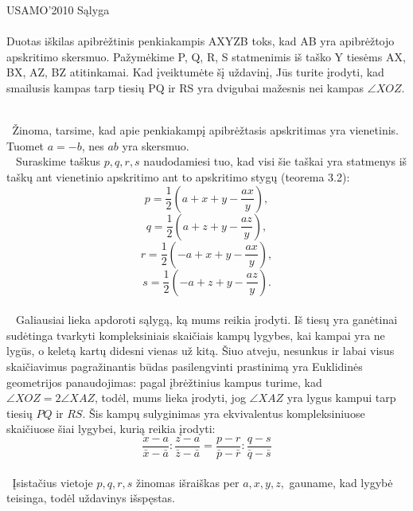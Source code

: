 \begin{pavnr}
USAMO'2010 Sąlyga
\\
   \\Duotas iškilas apibrėžtinis penkiakampis AXYZB toks, kad AB yra apibrėžtojo apskritimo
   skersmuo. Pažymėkime P, Q, R, S statmenimis iš taško Y tiesėms  AX, BX, AZ, BZ atitinkamai.
   Kad įveiktumėte šį uždavinį, Jūs turite įrodyti, kad smailusis kampas tarp tiesių PQ ir RS
   yra dvigubai mažesnis nei kampas $ \angle XOZ$.
\end{pavnr}
\begin{sprendimas}
  \\ $\phantom{a}$Žinoma, tarsime, kad apie penkiakampį apibrėžtasis apskritimas yra vienetinis.
      Tuomet $a = -b$, nes $ab$ yra skersmuo.
  \\ $\phantom{a}$
Suraskime taškus $p, q, r, s$ naudodamiesi tuo, kad visi šie taškai yra statmenys iš taškų ant vienetinio apskritimo
ant to apskritimo stygų (teorema 3.2):
     $$p = \frac {1}{2}( a+x+y- \frac {ax}{y}),$$
     $$q = \frac {1}{2}( a+z+y- \frac {az}{y}),$$ 
     $$r = \frac {1}{2}( -a+x+y- \frac {ax}{y}),$$
     $$s = \frac {1}{2}( -a+z+y- \frac {az}{y}).$$
  \\ $\phantom{a}$ Galiausiai lieka apdoroti sąlygą, ką mums reikia įrodyti. Iš tiesų yra
      ganėtinai sudėtinga tvarkyti kompleksiniais skaičiais kampų lygybes, 
      kai kampai yra ne lygūs, o keletą kartų didesni vienas už kitą.
      Šiuo atveju, nesunkus ir labai visus skaičiavimus pagražinantis būdas
      pasilengvinti prastinimą yra Euklidinės geometrijos panaudojimas: pagal
      įbrėžtinius kampus turime, kad $ \angle XOZ = 2 \angle XAZ$, todėl,
      mums lieka įrodyti, jog  $ \angle XAZ $ yra lygus kampui tarp tiesių $PQ$ ir
      $RS$. Šis kampų sulyginimas yra ekvivalentus kompleksiniuose skaičiuose šiai lygybei, kurią reikia įrodyti: 
$$\frac {x-a} {\bar x - \bar a} : \frac{z-a}{\bar z - \bar a} = \frac{p-r}{\bar p - \bar r} : \frac{q-s}{\bar q - \bar s}$$
  \\ $\phantom{a}$Įsistačius vietoje $p, q, r, s$ žinomas išraiškas per $a, x, y, z,$ gauname, kad 
   lygybė teisinga, todėl uždavinys išspęstas.
     \end{sprendimas}
     
